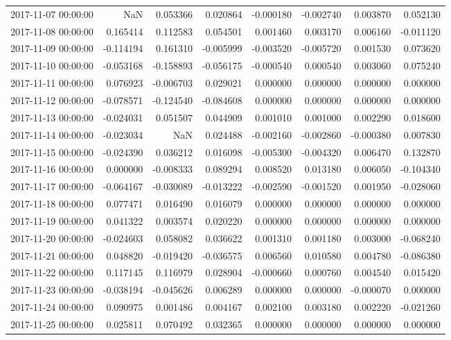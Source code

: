 \begin{tabular}{lrrrrrrr}
2017-11-07 00:00:00 & NaN & 0.053366 & 0.020864 & -0.000180 & -0.002740 & 0.003870 & 0.052130 \\
2017-11-08 00:00:00 & 0.165414 & 0.112583 & 0.054501 & 0.001460 & 0.003170 & 0.006160 & -0.011120 \\
2017-11-09 00:00:00 & -0.114194 & 0.161310 & -0.005999 & -0.003520 & -0.005720 & 0.001530 & 0.073620 \\
2017-11-10 00:00:00 & -0.053168 & -0.158893 & -0.056175 & -0.000540 & 0.000540 & 0.003060 & 0.075240 \\
2017-11-11 00:00:00 & 0.076923 & -0.006703 & 0.029021 & 0.000000 & 0.000000 & 0.000000 & 0.000000 \\
2017-11-12 00:00:00 & -0.078571 & -0.124540 & -0.084608 & 0.000000 & 0.000000 & 0.000000 & 0.000000 \\
2017-11-13 00:00:00 & -0.024031 & 0.051507 & 0.044909 & 0.001010 & 0.001000 & 0.002290 & 0.018600 \\
2017-11-14 00:00:00 & -0.023034 & NaN & 0.024488 & -0.002160 & -0.002860 & -0.000380 & 0.007830 \\
2017-11-15 00:00:00 & -0.024390 & 0.036212 & 0.016098 & -0.005300 & -0.004320 & 0.006470 & 0.132870 \\
2017-11-16 00:00:00 & 0.000000 & -0.008333 & 0.089294 & 0.008520 & 0.013180 & 0.006050 & -0.104340 \\
2017-11-17 00:00:00 & -0.064167 & -0.030089 & -0.013222 & -0.002590 & -0.001520 & 0.001950 & -0.028060 \\
2017-11-18 00:00:00 & 0.077471 & 0.016490 & 0.016079 & 0.000000 & 0.000000 & 0.000000 & 0.000000 \\
2017-11-19 00:00:00 & 0.041322 & 0.003574 & 0.020220 & 0.000000 & 0.000000 & 0.000000 & 0.000000 \\
2017-11-20 00:00:00 & -0.024603 & 0.058082 & 0.036622 & 0.001310 & 0.001180 & 0.003000 & -0.068240 \\
2017-11-21 00:00:00 & 0.048820 & -0.019420 & -0.036575 & 0.006560 & 0.010580 & 0.004780 & -0.086380 \\
2017-11-22 00:00:00 & 0.117145 & 0.116979 & 0.028904 & -0.000660 & 0.000760 & 0.004540 & 0.015420 \\
2017-11-23 00:00:00 & -0.038194 & -0.045626 & 0.006289 & 0.000000 & 0.000000 & -0.000070 & 0.000000 \\
2017-11-24 00:00:00 & 0.090975 & 0.001486 & 0.004167 & 0.002100 & 0.003180 & 0.002220 & -0.021260 \\
2017-11-25 00:00:00 & 0.025811 & 0.070492 & 0.032365 & 0.000000 & 0.000000 & 0.000000 & 0.000000 \\

\end{tabular}
